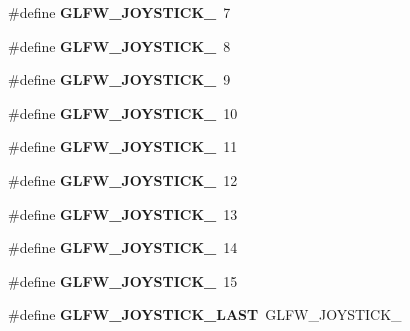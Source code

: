 \begin{DoxyCompactItemize}
\item 
\mbox{\label{group__joysticks_ga21a934c940bcf25db0e4c8fe9b364bdb}} 
\#define {\bfseries G\+L\+F\+W\+\_\+\+J\+O\+Y\+S\+T\+I\+C\+K\+\_}~7
\item 
\mbox{\label{group__joysticks_ga87689d47df0ba6f9f5fcbbcaf7b3cecf}} 
\#define {\bfseries G\+L\+F\+W\+\_\+\+J\+O\+Y\+S\+T\+I\+C\+K\+\_}~8
\item 
\mbox{\label{group__joysticks_gaef55389ee605d6dfc31aef6fe98c54ec}} 
\#define {\bfseries G\+L\+F\+W\+\_\+\+J\+O\+Y\+S\+T\+I\+C\+K\+\_}~9
\item 
\mbox{\label{group__joysticks_gae7d26e3df447c2c14a569fcc18516af4}} 
\#define {\bfseries G\+L\+F\+W\+\_\+\+J\+O\+Y\+S\+T\+I\+C\+K\+\_}~10
\item 
\mbox{\label{group__joysticks_gab91bbf5b7ca6be8d3ac5c4d89ff48ac7}} 
\#define {\bfseries G\+L\+F\+W\+\_\+\+J\+O\+Y\+S\+T\+I\+C\+K\+\_}~11
\item 
\mbox{\label{group__joysticks_ga5c84fb4e49bf661d7d7c78eb4018c508}} 
\#define {\bfseries G\+L\+F\+W\+\_\+\+J\+O\+Y\+S\+T\+I\+C\+K\+\_}~12
\item 
\mbox{\label{group__joysticks_ga89540873278ae5a42b3e70d64164dc74}} 
\#define {\bfseries G\+L\+F\+W\+\_\+\+J\+O\+Y\+S\+T\+I\+C\+K\+\_}~13
\item 
\mbox{\label{group__joysticks_ga7b02ab70daf7a78bcc942d5d4cc1dcf9}} 
\#define {\bfseries G\+L\+F\+W\+\_\+\+J\+O\+Y\+S\+T\+I\+C\+K\+\_}~14
\item 
\mbox{\label{group__joysticks_ga453edeeabf350827646b6857df4f80ce}} 
\#define {\bfseries G\+L\+F\+W\+\_\+\+J\+O\+Y\+S\+T\+I\+C\+K\+\_}~15
\item 
\mbox{\label{group__joysticks_ga9ca13ebf24c331dd98df17d84a4b72c9}} 
\#define {\bfseries G\+L\+F\+W\+\_\+\+J\+O\+Y\+S\+T\+I\+C\+K\+\_\+\+L\+A\+ST}~G\+L\+F\+W\+\_\+\+J\+O\+Y\+S\+T\+I\+C\+K\+\_
\item 

\end{DoxyCompactItemize}
